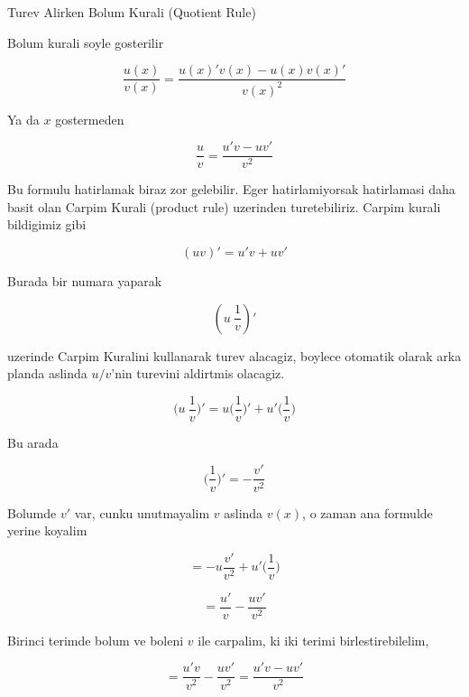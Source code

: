 \documentclass[12pt,fleqn]{article}\usepackage{../common}
\begin{document}
Turev Alirken Bolum Kurali (Quotient Rule)

Bolum kurali soyle gosterilir 

\[ \frac{ u(x)}{v(x)} = \frac{u(x)'v(x) - u(x)v(x)'}{v(x)^2} \]

Ya da $x$ gostermeden

\[ \frac{ u}{v} = \frac{u'v - uv'}{v^2} \]

Bu formulu hatirlamak biraz zor gelebilir. Eger hatirlamiyorsak hatirlamasi
daha basit olan Carpim Kurali (product rule) uzerinden
turetebiliriz. Carpim kurali bildigimiz gibi

\[ (uv)' = u'v + uv' \]

Burada bir numara yaparak 

\[ (u \ \frac{ 1}{v})' \]

uzerinde Carpim Kuralini kullanarak turev alacagiz, boylece otomatik olarak
arka planda aslinda $u/v$'nin turevini aldirtmis olacagiz. 

\[ \bigg(u \ \frac{ 1}{v}\bigg)' = 
u \bigg(\frac{1}{v}\bigg)' + u' \bigg(\frac{1}{v}\bigg)
\]

Bu arada

\[ \bigg(\frac{ 1}{v}\bigg)'  = -\frac{v'}{v^2} \]

Bolumde $v'$ var, cunku unutmayalim $v$ aslinda $v(x)$, o zaman ana
formulde yerine koyalim

\[  = 
-u\frac{v'}{v^2}  + u' \bigg(\frac{1}{v}\bigg)
\]

\[  = 
\frac{u' }{v} -\frac{uv'}{v^2}
\]


Birinci terimde bolum ve boleni $v$ ile carpalim, ki iki terimi
birlestirebilelim, 

\[  = 
\frac{u'v }{v^2} -\frac{uv'}{v^2} = 
\frac{u'v-uv'}{v^2}
\]
\end{document}
